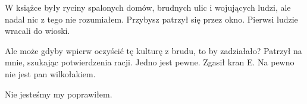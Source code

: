W książce były ryciny spalonych domów, brudnych ulic i wojujących ludzi, ale nadal nic z tego nie rozumiałem.
Przybysz patrzył się przez okno. Pierwsi ludzie wracali do wioski.

\ds{} Ale może gdyby wpierw oczyścić tę kulturę z brudu, to by zadziałało? \dm{} Patrzył na mnie, szukając potwierdzenia racji.
\dm{} Jedno jest pewne. \dm{} Zgasił kran E. \dm{} Na pewno nie jest pan wilkołakiem. \de{}

\ds{} Nie jesteśmy my \dm{} poprawiłem. \de{}













